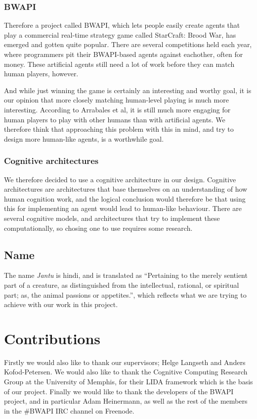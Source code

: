 \subsubsection{BWAPI}
Therefore a project called BWAPI, which lets people easily create agents that play a commercial real-time strategy game called StarCraft: Brood War, has emerged and gotten quite popular.\cite{bwapi} There are several competitions held each year, where programmers pit their BWAPI-based agents against eachother, often for money.\cite{sscait} These artificial agents still need a lot of work before they can match human players, however.\cite{eisbotvsfong}

And while just winning the game is certainly an interesting and worthy goal, it is our opinion that more closely matching human-level playing is much more interesting. According to Arrabales et al, it is still much more engaging for human players to play with other humans than with artificial agents.\cite{arrabales2009gamechars} We therefore think that approaching this problem with this in mind, and try to design more human-like agents, is a worthwhile goal.

\subsubsection{Cognitive architectures}
We therefore decided to use a cognitive architecture in our design. Cognitive architectures are architectures that base themselves on an understanding of how human cognition work, and the logical conclusion would therefore be that using this for implementing an agent would lead to human-like behaviour. There are several cognitive models, and architectures that try to implement these computationally, so chosing one to use requires some research.

\subsection{Name}
\label{sec:name}
The name {\em Jantu} is hindi, and is translated as ``Pertaining to the merely sentient part of a creature, as distinguished from the intellectual, rational, or spiritual part; as, the animal passions or appetites.'', which reflects what we are trying to achieve with our work in this project.\cite{hindijantu}

\section{Contributions}
\label{sec:contributions}
Firstly we would also like to thank our supervisors; Helge Langseth and Anders Kofod-Petersen. We would also like to thank the Cognitive Computing Research Group at the University of Memphis, for their LIDA framework which is the basis of our project. Finally we would like to thank the developers of the BWAPI project, and in particular Adam Heinermann, as well as the rest of the members in the \#BWAPI IRC channel on Freenode.

